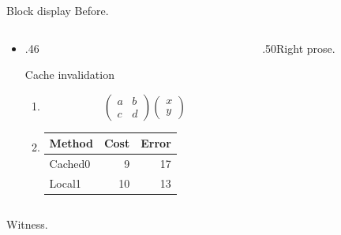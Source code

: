 \documentclass[11pt]{beamer}
\begin{document}
\begin{frame}[t]{Block display}
Before.\par
\begin{itemize}\item \begin{columns}[onlytextwidth,b]
\begin{column}{.46\textwidth}\begin{alertblock}{Cache invalidation}
\begin{enumerate}
\item \[\begin{pmatrix}a&b\\c&d\end{pmatrix}\begin{pmatrix}x\\y\end{pmatrix}\]
\item \begin{tabular}{lrr}Method&Cost&Error\\\hline Cached0&9&17\\Local1&10&13\\\end{tabular}
\end{enumerate}\end{alertblock}\end{column}
\begin{column}{.50\textwidth}Right prose.\end{column}
\end{columns}\end{itemize}
Witness.\par
\end{frame}
\end{document}
